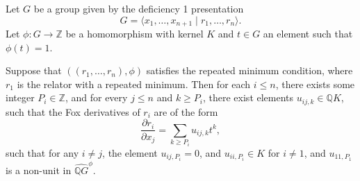 Let $G$ be a group given by the deficiency 1 presentation \[G = \langle x_1, \ldots, x_{n + 1} \mid r_1, \ldots, r_n \rangle.\] Let $\phi \colon G \to \mathbb{Z}$ be a homomorphism with kernel $K$ and $t \in G$ an element such that $\phi(t) = 1$. 

\begin{lemma}\label{matrix}
Suppose that $((r_1, \ldots, r_n), \phi)$ satisfies the repeated minimum condition, where $r_1$ is the relator with a repeated minimum. Then for each $i\leq n$, there exists some integer $P_i \in \mathbb{Z}$, and for every $j \leq n$ and $k \geq P_i$, there exist elements $u_{ij,k} \in \mathbb{Q}K$, such that the Fox derivatives of $r_i$ are of the form 
\[\frac{\partial r_i}{\partial x_j} = \sum_{k \geq P_i} u_{ij, k}t^{k},\]
such that for any $i \neq j$, the element $u_{ij, P_i} = 0$, and $u_{ii, P_i} \in K$ for $i \neq 1$, and $u_{11, P_1}$ is a non-unit in $\widehat{\mathbb{Q}G}^{\phi}$.
\end{lemma}

